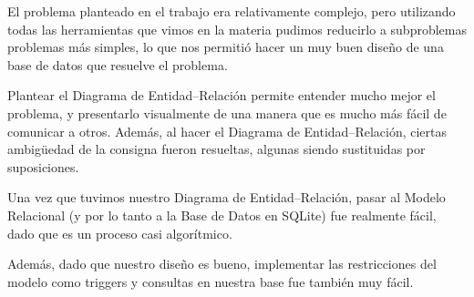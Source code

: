 


El problema planteado en el trabajo era relativamente complejo, pero utilizando todas las herramientas que vimos en la materia pudimos reducirlo a subproblemas problemas más simples, lo que nos permitió hacer un muy buen diseño de una base de datos que resuelve el problema.

Plantear el Diagrama de Entidad--Relación permite entender mucho mejor el problema, y presentarlo visualmente de una manera que es mucho más fácil de comunicar a otros. Además, al hacer el Diagrama de Entidad--Relación, ciertas ambigüedad de la consigna fueron resueltas, algunas siendo sustituidas por suposiciones.

Una vez que tuvimos nuestro Diagrama de Entidad--Relación, pasar al Modelo Relacional (y por lo tanto a la Base de Datos en SQLite) fue realmente fácil, dado que es un proceso casi algorítmico.

Además, dado que nuestro diseño es bueno, implementar las restricciones del modelo como triggers y consultas en nuestra base fue también muy fácil.
